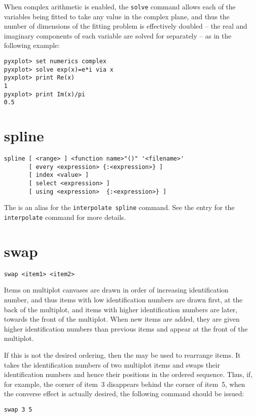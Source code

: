 When complex arithmetic is enabled, the {\tt solve} command allows each of the
variables being fitted to take any value in the complex plane, and thus the
number of dimensions of the fitting problem is effectively doubled -- the real
and imaginary components of each variable are solved for separately -- as in
the following example:

\begin{verbatim}
pyxplot> set numerics complex
pyxplot> solve exp(x)=e*i via x
pyxplot> print Re(x)
1
pyxplot> print Im(x)/pi
0.5
\end{verbatim}


\section{spline}

\begin{verbatim}
spline [ <range> ] <function name>"()" '<filename>'
       [ every <expression> {:<expression>} ]
       [ index <value> ]
       [ select <expression> ]
       [ using <expression>  {:<expression>} ]
\end{verbatim}

The  is an alias for the {\tt interpolate spline} command.
See the entry for the {\tt interpolate} command for more details.


\section{swap}

\begin{verbatim}
swap <item1> <item2>
\end{verbatim}

Items on multiplot canvases are drawn in order of increasing identification
number, and thus items with low identification numbers are drawn first, at the
back of the multiplot, and items with higher identification numbers are later,
towards the front of the multiplot. When new items are added, they are given
higher identification numbers than previous items and appear at the front of
the multiplot.

If this is not the desired ordering, then the  may be used to
rearrange items. It takes the identification numbers of two multiplot items and
swaps their identification numbers and hence their positions in the ordered
sequence.  Thus, if, for example, the corner of item~3 disappears behind the
corner of item~5, when the converse effect is actually desired, the following
command should be issued:
\begin{verbatim}
swap 3 5
\end{verbatim}


